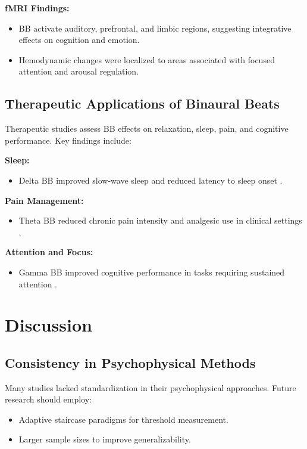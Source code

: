 \documentclass[12pt]{article}
\begin{document}
\textbf{fMRI Findings:}
\begin{itemize}
    \item BB activate auditory, prefrontal, and limbic regions, suggesting integrative effects on cognition and emotion.
    \item Hemodynamic changes were localized to areas associated with focused attention and arousal regulation.
\end{itemize}

\subsection{Therapeutic Applications of Binaural Beats}
Therapeutic studies assess BB effects on relaxation, sleep, pain, and cognitive performance. Key findings include:

\textbf{Sleep:}
\begin{itemize}
    \item Delta BB improved slow-wave sleep and reduced latency to sleep onset \cite{pratt2014mismatch}.
\end{itemize}

\textbf{Pain Management:}
\begin{itemize}
    \item Theta BB reduced chronic pain intensity and analgesic use in clinical settings \cite{pain2015theta}.
\end{itemize}

\textbf{Attention and Focus:}
\begin{itemize}
    \item Gamma BB improved cognitive performance in tasks requiring sustained attention \cite{colzato2015gamma}.
\end{itemize}

\section{Discussion}

\subsection{Consistency in Psychophysical Methods}
Many studies lacked standardization in their psychophysical approaches. Future research should employ:
\begin{itemize}
    \item Adaptive staircase paradigms for threshold measurement.
    \item Larger sample sizes to improve generalizability.
\end{itemize}
\end{document}
